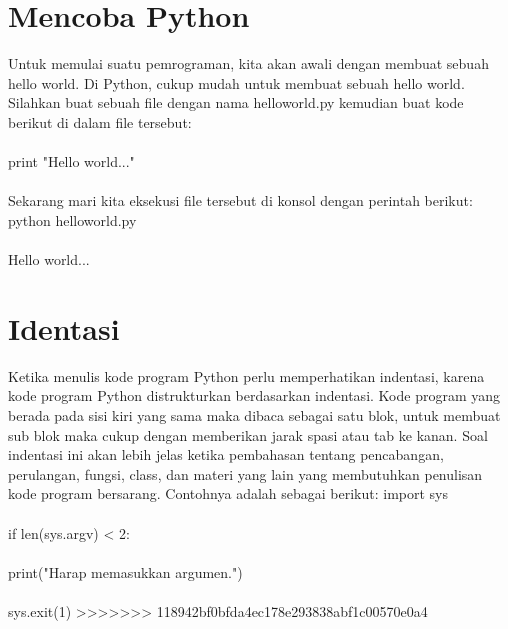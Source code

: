 \section{Mencoba Python}
Untuk memulai suatu pemrograman, kita akan awali dengan membuat sebuah hello world. Di Python, cukup mudah untuk membuat sebuah hello world. Silahkan buat sebuah file dengan nama helloworld.py kemudian buat kode berikut di dalam file tersebut:
\paragraph{}
print "Hello world..."
\paragraph{}
Sekarang mari kita eksekusi file tersebut di konsol dengan perintah berikut:
python helloworld.py
\paragraph{}
Hello world...

\section{Identasi}
Ketika menulis kode program Python perlu memperhatikan indentasi, karena kode program Python distrukturkan berdasarkan indentasi. Kode program yang berada pada sisi kiri yang sama maka dibaca sebagai satu blok, untuk membuat sub blok maka cukup dengan memberikan jarak spasi atau tab ke kanan.
Soal indentasi ini akan lebih jelas ketika pembahasan tentang pencabangan, perulangan, fungsi, class, dan materi yang lain yang membutuhkan penulisan kode program bersarang.
Contohnya adalah sebagai berikut:
import sys
\paragraph{}
if len(sys.argv) < 2:
\paragraph{}
    print("Harap memasukkan argumen.")
    \paragraph{}
    sys.exit(1)
>>>>>>> 118942bf0bfda4ec178e293838abf1c00570e0a4
